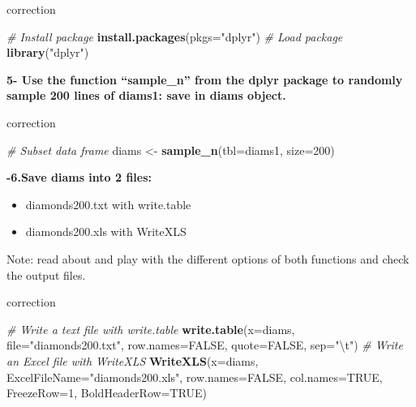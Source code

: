 \documentclass[]{book}
\newenvironment{Shaded}{\begin{snugshade}}{\end{snugshade}}
\newcommand{\CharTok}[1]{\textcolor[rgb]{0.31,0.60,0.02}{#1}}
\newcommand{\CommentTok}[1]{\textcolor[rgb]{0.56,0.35,0.01}{\textit{#1}}}
\newcommand{\DataTypeTok}[1]{\textcolor[rgb]{0.13,0.29,0.53}{#1}}
\newcommand{\DecValTok}[1]{\textcolor[rgb]{0.00,0.00,0.81}{#1}}
\newcommand{\KeywordTok}[1]{\textcolor[rgb]{0.13,0.29,0.53}{\textbf{#1}}}
\newcommand{\NormalTok}[1]{#1}
\newcommand{\OtherTok}[1]{\textcolor[rgb]{0.56,0.35,0.01}{#1}}
\newcommand{\StringTok}[1]{\textcolor[rgb]{0.31,0.60,0.02}{#1}}
\providecommand{\tightlist}{%
  \setlength{\itemsep}{0pt}\setlength{\parskip}{0pt}}
\begin{document}
correction

\begin{Shaded}
\begin{Highlighting}[]
\CommentTok{# Install package}
\KeywordTok{install.packages}\NormalTok{(}\DataTypeTok{pkgs=}\StringTok{"dplyr"}\NormalTok{)}
\CommentTok{# Load package}
\KeywordTok{library}\NormalTok{(}\StringTok{"dplyr"}\NormalTok{)}
\end{Highlighting}
\end{Shaded}

\textbf{5- Use the function ``sample\_n'' from the dplyr package to randomly sample 200 lines of diams1: save in diams object.}

correction

\begin{Shaded}
\begin{Highlighting}[]
\CommentTok{# Subset data frame}
\NormalTok{diams <-}\StringTok{ }\KeywordTok{sample_n}\NormalTok{(}\DataTypeTok{tbl=}\NormalTok{diams1, }\DataTypeTok{size=}\DecValTok{200}\NormalTok{)}
\end{Highlighting}
\end{Shaded}

\textbf{-6.Save diams into 2 files:}

\begin{itemize}
\tightlist
\item
  diamonds200.txt with write.table
\item
  diamonds200.xls with WriteXLS
\end{itemize}

Note: read about and play with the different options of both functions and check the output files.

correction

\begin{Shaded}
\begin{Highlighting}[]
\CommentTok{# Write a text file with write.table}
\KeywordTok{write.table}\NormalTok{(}\DataTypeTok{x=}\NormalTok{diams, }
    \DataTypeTok{file=}\StringTok{"diamonds200.txt"}\NormalTok{,}
        \DataTypeTok{row.names=}\OtherTok{FALSE}\NormalTok{,}
        \DataTypeTok{quote=}\OtherTok{FALSE}\NormalTok{,}
        \DataTypeTok{sep=}\StringTok{"}\CharTok{\textbackslash{}t}\StringTok{"}\NormalTok{)}
\CommentTok{# Write an Excel file with WriteXLS}
\KeywordTok{WriteXLS}\NormalTok{(}\DataTypeTok{x=}\NormalTok{diams, }
    \DataTypeTok{ExcelFileName=}\StringTok{"diamonds200.xls"}\NormalTok{, }
    \DataTypeTok{row.names=}\OtherTok{FALSE}\NormalTok{, }
    \DataTypeTok{col.names=}\OtherTok{TRUE}\NormalTok{, }
    \DataTypeTok{FreezeRow=}\DecValTok{1}\NormalTok{, }
    \DataTypeTok{BoldHeaderRow=}\OtherTok{TRUE}\NormalTok{)}
\end{Highlighting}
\end{Shaded}
\end{document}
